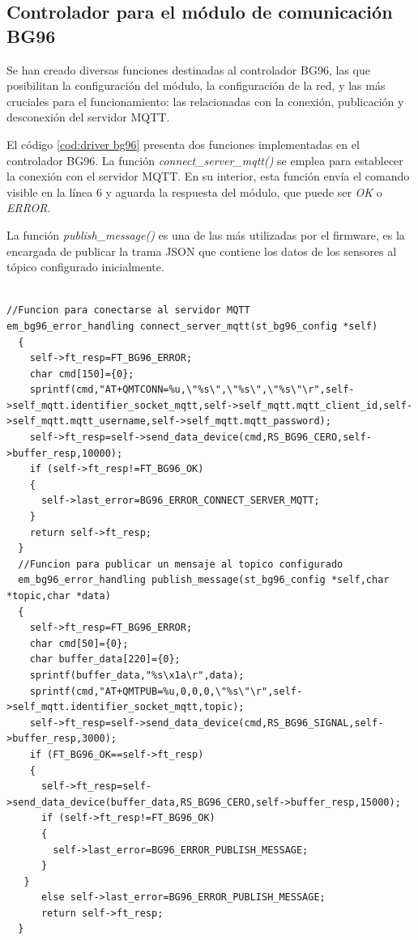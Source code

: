 \subsection{ Controlador para el módulo de comunicación BG96 } 
Se han creado diversas funciones destinadas al controlador BG96, las que posibilitan la configuración del módulo, la configuración de la red, y las más cruciales para el funcionamiento: las relacionadas con la conexión, publicación y desconexión del servidor MQTT.

El código \ref{cod:driver bg96} presenta dos funciones implementadas en el controlador BG96. La función \emph{connect\_server\_mqtt()} se emplea para establecer la conexión con el servidor MQTT. En su interior, esta función envía el comando visible en la línea 6 y aguarda la respuesta del módulo, que puede ser \emph{OK} o \emph{ERROR}.

La función \emph{publish\_message()} es una de las más utilizadas por el firmware, es la encargada de publicar la trama JSON que contiene los datos de los sensores al tópico configurado inicialmente. 
\begin{lstlisting}[label=cod:driver bg96,caption=Función de conexión y publicación al broker MQTT.]  % Start your code-block

//Funcion para conectarse al servidor MQTT
em_bg96_error_handling connect_server_mqtt(st_bg96_config *self)
  {
    self->ft_resp=FT_BG96_ERROR;
    char cmd[150]={0};
    sprintf(cmd,"AT+QMTCONN=%u,\"%s\",\"%s\",\"%s\"\r",self->self_mqtt.identifier_socket_mqtt,self->self_mqtt.mqtt_client_id,self->self_mqtt.mqtt_username,self->self_mqtt.mqtt_password);
    self->ft_resp=self->send_data_device(cmd,RS_BG96_CERO,self->buffer_resp,10000);
    if (self->ft_resp!=FT_BG96_OK)
    {
      self->last_error=BG96_ERROR_CONNECT_SERVER_MQTT;
    }
    return self->ft_resp;
  }
  //Funcion para publicar un mensaje al topico configurado 
  em_bg96_error_handling publish_message(st_bg96_config *self,char *topic,char *data)
  {
    self->ft_resp=FT_BG96_ERROR;
    char cmd[50]={0};
    char buffer_data[220]={0};
    sprintf(buffer_data,"%s\x1a\r",data);
    sprintf(cmd,"AT+QMTPUB=%u,0,0,0,\"%s\"\r",self->self_mqtt.identifier_socket_mqtt,topic);
    self->ft_resp=self->send_data_device(cmd,RS_BG96_SIGNAL,self->buffer_resp,3000);
    if (FT_BG96_OK==self->ft_resp)
    {
      self->ft_resp=self->send_data_device(buffer_data,RS_BG96_CERO,self->buffer_resp,15000);
      if (self->ft_resp!=FT_BG96_OK)
      {
        self->last_error=BG96_ERROR_PUBLISH_MESSAGE;
      }   
   }
      else self->last_error=BG96_ERROR_PUBLISH_MESSAGE;
      return self->ft_resp;
  }
\end{lstlisting}


